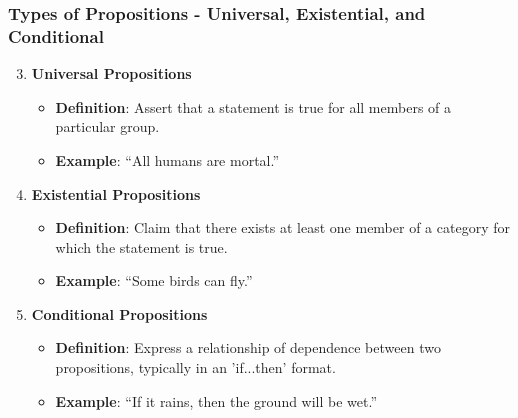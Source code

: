 \documentclass[aspectratio=169]{beamer}
\begin{document}
\begin{frame}[fragile]
    \frametitle{Types of Propositions - Universal, Existential, and Conditional}
    \begin{enumerate}
        \setcounter{enumi}{2}
        \item \textbf{Universal Propositions}
            \begin{itemize}
                \item \textbf{Definition}: Assert that a statement is true for all members of a particular group.
                \item \textbf{Example}: ``All humans are mortal.''
            \end{itemize}
        
        \item \textbf{Existential Propositions}
            \begin{itemize}
                \item \textbf{Definition}: Claim that there exists at least one member of a category for which the statement is true.
                \item \textbf{Example}: ``Some birds can fly.''
            \end{itemize}
        
        \item \textbf{Conditional Propositions}
            \begin{itemize}
                \item \textbf{Definition}: Express a relationship of dependence between two propositions, typically in an 'if...then' format.
                \item \textbf{Example}: ``If it rains, then the ground will be wet.''
            \end{itemize}
    \end{enumerate}
\end{frame}
\end{document}
